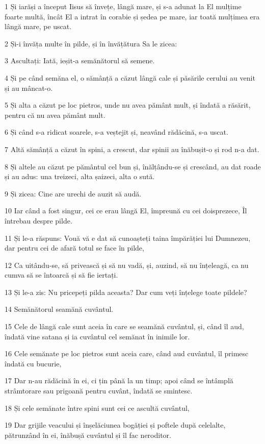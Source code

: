 \par 1 Și iarăși a început Iisus să învețe, lângă mare, și s-a adunat la El mulțime foarte multă, încât El a intrat în corabie și ședea pe mare, iar toată mulțimea era lângă mare, pe uscat.
\par 2 Și-i învăța multe în pilde, și în învățătura Sa le zicea:
\par 3 Ascultați: Iată, ieșit-a semănătorul să semene.
\par 4 Și pe când semăna el, o sămânță a căzut lângă cale și păsările cerului au venit și au mâncat-o.
\par 5 Și alta a căzut pe loc pietros, unde nu avea pământ mult, și îndată a răsărit, pentru că nu avea pământ mult.
\par 6 Și când s-a ridicat soarele, s-a veștejit și, neavând rădăcină, s-a uscat.
\par 7 Altă sămânță a căzut în spini, a crescut, dar spinii au înăbușit-o și rod n-a dat.
\par 8 Și altele au căzut pe pământul cel bun și, înălțându-se și crescând, au dat roade și au adus: una treizeci, alta șaizeci, alta o sută.
\par 9 Și zicea: Cine are urechi de auzit să audă.
\par 10 Iar când a fost singur, cei ce erau lângă El, împreună cu cei doisprezece, Îl întrebau despre pilde.
\par 11 Și le-a răspuns: Vouă vă e dat să cunoașteți taina împărăției lui Dumnezeu, dar pentru cei de afară totul se face în pilde,
\par 12 Ca uitându-se, să privească și să nu vadă, și, auzind, să nu înțeleagă, ca nu cumva să se întoarcă și să fie iertați.
\par 13 Și le-a zis: Nu pricepeți pilda aceasta? Dar cum veți înțelege toate pildele?
\par 14 Semănătorul seamănă cuvântul.
\par 15 Cele de lângă cale sunt aceia în care se seamănă cuvântul, și, când îl aud, îndată vine satana și ia cuvântul cel semănat în inimile lor.
\par 16 Cele semănate pe loc pietros sunt aceia care, când aud cuvântul, îl primesc îndată cu bucurie,
\par 17 Dar n-au rădăcină în ei, ci țin până la un timp; apoi când se întâmplă strâmtorare sau prigoană pentru cuvânt, îndată se smintesc.
\par 18 Și cele semănate între spini sunt cei ce ascultă cuvântul,
\par 19 Dar grijile veacului și înșelăciunea bogăției și poftele după celelalte, pătrunzând în ei, înăbușă cuvântul și îl fac neroditor.
